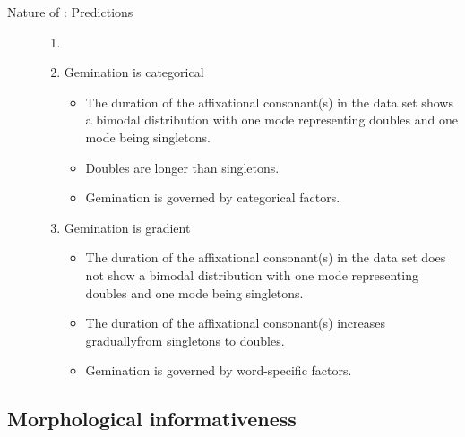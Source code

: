 \begin{description}
\item[Nature of : Predictions] \label{predictions nature of gemination}

\begin{enumerate}[leftmargin=*,label=\Alph*:]
    \item[]
 	\item Gemination is categorical
        \begin{itemize}[leftmargin=*]
            \item The duration of the affixational consonant(s) in the data set shows a bimodal distribution with one mode representing doubles and one mode being singletons.
            \item Doubles are longer than singletons. 
            \item Gemination is governed by categorical factors.
        \end{itemize}
    \item Gemination is gradient
            \begin{itemize}[leftmargin=*]
            \item The duration of the affixational consonant(s) in the data set does not show a bimodal distribution with one mode representing doubles and one mode being singletons.
            \item The duration of the affixational consonant(s) increases gradually\linebreak from singletons to doubles.
            \item Gemination is governed by word-specific factors.
            \end{itemize}
\end{enumerate}
\end{description}

\subsection{Morphological informativeness} \label{morphological informativeness}

